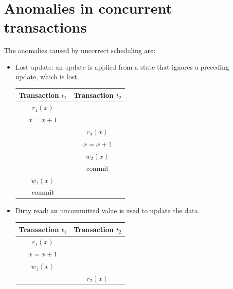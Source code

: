 \documentclass[12pt, a4paper]{report}
\newtheorem[style=M,bodystyle=\normalfont]{theorem}{Theorem}
\newtheorem[style=M,bodystyle=\normalfont]{corollary}{Corollary}
\newtheorem[style=M,bodystyle=\normalfont]{lemma}{Lemma}
\newtheorem[style=M,bodystyle=\normalfont]{definition}{Definition}
\begin{document}
    \section{Anomalies in concurrent transactions}
    The anomalies caused by uncorrect scheduling are: 
    \begin{itemize}
        \item Lost update: an update is applied from a state that ignores a preceding update, which is lost.
            \begin{table}[H]
                \centering
                \begin{tabular}{c|c}
                \textbf{Transaction $t_1$}    & \textbf{Transaction $t_2$} \\ \hline
                $r_1(x)$                      &                            \\
                $x=x+1$                       &                            \\
                                              & $r_2(x)$                   \\
                                              & $x=x+1$                    \\
                                              & $w_2(x)$                   \\
                                              & commit                     \\
                $w_1(x)$                      &                            \\
                commit                        &                           
                \end{tabular}
            \end{table}
        \item Dirty read: an uncommitted value is used to update the data. 
            \begin{table}[H]
                \centering
                \begin{tabular}{c|c}
                \textbf{Transaction $t_1$} & \textbf{Transaction $t_2$} \\ \hline
                $r_1(x)$                   &                            \\
                $x=x+1$                    &                            \\
                $w_1(x)$                   &                            \\
                                        & $r_2(x)$                   \\

\end{tabular}
\end{table}
\end{itemize}
\end{document}
